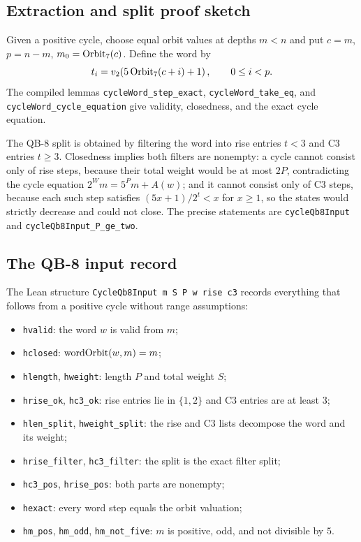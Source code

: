 \subsection{Extraction and split proof sketch}

Given a positive cycle, choose equal orbit values at depths $m<n$ and
put $c=m$, $p=n-m$, $m_0=\mathrm{Orbit}_7(c)$.  Define the word by
\begin{equation*}
  t_i=v_2\!\left(5\,\mathrm{Orbit}_7(c+i)+1\right),\qquad 0\le i<p.
\end{equation*}
The compiled lemmas \texttt{cycleWord\_step\_exact},
\texttt{cycleWord\_take\_eq}, and \texttt{cycleWord\_cycle\_equation}
give validity, closedness, and the exact cycle equation.

The QB-8 split is obtained by filtering the word into rise entries
$t<3$ and C3 entries $t\ge3$.  Closedness implies both filters are
nonempty: a cycle cannot consist only of rise steps, because their
total weight would be at most $2P$, contradicting the cycle equation
$2^Wm=5^Pm+A(w)$; and it cannot consist only of C3 steps, because each
such step satisfies $(5x+1)/2^t<x$ for $x\ge1$, so the states would
strictly decrease and could not close.  The precise statements are
\texttt{cycleQb8Input} and
\texttt{cycleQb8Input\_P\_ge\_two}.

\subsection{The QB-8 input record}

The Lean structure \texttt{CycleQb8Input m S P w rise c3} records
everything that follows from a positive cycle without range
assumptions:
\begin{itemize}[leftmargin=*]
\item \texttt{hvalid}: the word $w$ is valid from $m$;
\item \texttt{hclosed}: $\mathrm{wordOrbit}(w,m)=m$;
\item \texttt{hlength}, \texttt{hweight}: length $P$ and total
  weight $S$;
\item \texttt{hrise\_ok}, \texttt{hc3\_ok}: rise entries lie in
  $\{1,2\}$ and C3 entries are at least $3$;
\item \texttt{hlen\_split}, \texttt{hweight\_split}: the rise and C3
  lists decompose the word and its weight;
\item \texttt{hrise\_filter}, \texttt{hc3\_filter}: the split is the
  exact filter split;
\item \texttt{hc3\_pos}, \texttt{hrise\_pos}: both parts are
  nonempty;
\item \texttt{hexact}: every word step equals the orbit valuation;
\item \texttt{hm\_pos}, \texttt{hm\_odd}, \texttt{hm\_not\_five}:
  $m$ is positive, odd, and not divisible by $5$.
\end{itemize}

